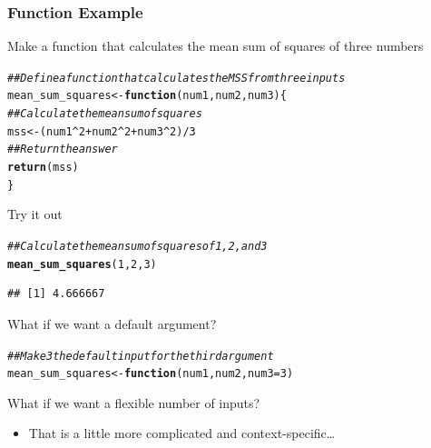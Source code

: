 \documentclass{beamer}\usepackage[]{graphicx}\usepackage[]{xcolor}
\makeatletter
\newcommand{\hlnum}[1]{\textcolor[rgb]{0.686,0.059,0.569}{#1}}%
\newcommand{\hlcom}[1]{\textcolor[rgb]{0.678,0.584,0.686}{\textit{#1}}}%
\newcommand{\hlopt}[1]{\textcolor[rgb]{0,0,0}{#1}}%
\newcommand{\hlstd}[1]{\textcolor[rgb]{0.345,0.345,0.345}{#1}}%
\newcommand{\hlkwa}[1]{\textcolor[rgb]{0.161,0.373,0.58}{\textbf{#1}}}%
\newcommand{\hlkwb}[1]{\textcolor[rgb]{0.69,0.353,0.396}{#1}}%
\newcommand{\hlkwc}[1]{\textcolor[rgb]{0.333,0.667,0.333}{#1}}%
\newcommand{\hlkwd}[1]{\textcolor[rgb]{0.737,0.353,0.396}{\textbf{#1}}}%
\newenvironment{kframe}{%
 \def\at@end@of@kframe{}%
 \ifinner\ifhmode%
  \def\at@end@of@kframe{\end{minipage}}%
  \begin{minipage}{\columnwidth}%
 \fi\fi%
 \def\FrameCommand##1{\hskip\@totalleftmargin \hskip-\fboxsep
 \colorbox{shadecolor}{##1}\hskip-\fboxsep
     \hskip-\linewidth \hskip-\@totalleftmargin \hskip\columnwidth}%
 \MakeFramed {\advance\hsize-\width
   \@totalleftmargin\z@ \linewidth\hsize
   \@setminipage}}%
 {\par\unskip\endMakeFramed%
 \at@end@of@kframe}
\newenvironment{knitrout}{}{} %
\makeatother
\begin{document}
\begin{frame}[fragile]\frametitle{Function Example}
    Make a function that calculates the mean sum of squares of three numbers \\
\begin{knitrout}\footnotesize
{}\color{fgcolor}\begin{kframe}
\begin{alltt}
\hlcom{## Define a function that calculates the MSS from three inputs}
\hlstd{mean_sum_squares} \hlkwb{<-} \hlkwa{function}\hlstd{(}\hlkwc{num1}\hlstd{,} \hlkwc{num2}\hlstd{,} \hlkwc{num3}\hlstd{)\{}
  \hlcom{## Calculate the mean sum of squares}
  \hlstd{mss} \hlkwb{<-} \hlstd{(num1}\hlopt{^}\hlnum{2} \hlopt{+} \hlstd{num2}\hlopt{^}\hlnum{2} \hlopt{+} \hlstd{num3}\hlopt{^}\hlnum{2}\hlstd{)} \hlopt{/} \hlnum{3}
  \hlcom{## Return the answer}
  \hlkwd{return}\hlstd{(mss)}
\hlstd{\}}
\end{alltt}
\end{kframe}
\end{knitrout}
    \vspace{1ex}
    Try it out
\begin{knitrout}\footnotesize
{}\color{fgcolor}\begin{kframe}
\begin{alltt}
\hlcom{## Calculate the mean sum of squares of 1, 2, and 3}
\hlkwd{mean_sum_squares}\hlstd{(}\hlnum{1}\hlstd{,} \hlnum{2}\hlstd{,} \hlnum{3}\hlstd{)}
\end{alltt}
\begin{verbatim}
## [1] 4.666667
\end{verbatim}
\end{kframe}
\end{knitrout}
    \vspace{1ex}
    What if we want a default argument?
\begin{knitrout}\footnotesize
{}\color{fgcolor}\begin{kframe}
\begin{alltt}
\hlcom{## Make 3 the default input for the third argument}
mean_sum_squares <- \hlkwd{function}(num1, num2, num3 = 3)
\end{alltt}
\end{kframe}
\end{knitrout}
    \vspace{1ex}
    What if we want a flexible number of inputs?
    \begin{itemize}
        \item That is a little more complicated and context-specific\ldots
    \end{itemize}
\end{frame}
\end{document}
